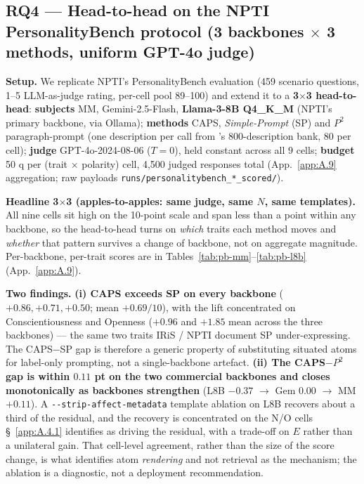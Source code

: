 

\subsection{RQ4 --- Head-to-head on the NPTI PersonalityBench protocol (3 backbones $\times$ 3 methods, uniform GPT-4o judge)}
\label{sec:4.4}

\textbf{Setup.} We replicate NPTI's PersonalityBench evaluation \cite{NPTI} (459 scenario questions, 1--5 LLM-as-judge rating, per-cell pool 89--100) and extend it to a \textbf{3$\times$3 head-to-head}: \textbf{subjects} MM, Gemini-2.5-Flash, \textbf{Llama-3-8B Q4\_K\_M} (NPTI's primary backbone, via Ollama); \textbf{methods} CAPS, \textit{Simple-Prompt} (SP) and \textit{$P^{\!2}$} \cite{jiang2023p2} paragraph-prompt (one description per call from \citet{NPTI}'s 800-description bank, 80 per cell); \textbf{judge} GPT-4o-2024-08-06 ($T=0$), held constant across all 9 cells; \textbf{budget} 50 q per (trait $\times$ polarity) cell, 4,500 judged responses total (App.~\ref{app:A.9} aggregation; raw payloads \texttt{runs/\allowbreak{}personalitybench\_\allowbreak{}*\_\allowbreak{}scored/\allowbreak{}}).

\textbf{Headline 3$\times$3 (apples-to-apples: same judge, same $N$, same templates).} All nine cells sit high on the 10-point scale and span less than a point within any backbone, so the head-to-head turns on \textit{which} traits each method moves and \textit{whether} that pattern survives a change of backbone, not on aggregate magnitude. Per-backbone, per-trait scores are in Tables~\ref{tab:pb-mm}--\ref{tab:pb-l8b} (App.~\ref{app:A.9}).

\textbf{Two findings.} \textbf{(i) CAPS exceeds SP on every backbone} ($+0.86, +0.71, +0.50$; mean $+0.69/10$), with the lift concentrated on Conscientiousness and Openness ($+0.96$ and $+1.85$ mean across the three backbones) --- the same two traits IRiS / NPTI document SP under-expressing. The CAPS$-$SP gap is therefore a generic property of substituting situated atoms for label-only prompting, not a single-backbone artefact. \textbf{(ii) The CAPS$-$$P^{\!2}$ gap is within $0.11$ pt on the two commercial backbones and closes monotonically as backbones strengthen} (L8B $-0.37$ $\to$ Gem $0.00$ $\to$ MM $+0.11$). A \texttt{-\allowbreak{}-\allowbreak{}strip-\allowbreak{}affect-\allowbreak{}metadata} template ablation on L8B recovers about a third of the residual, and the recovery is concentrated on the N/O cells \S~\ref{app:A.4.1} identifies as driving the residual, with a trade-off on $E$ rather than a unilateral gain. That cell-level agreement, rather than the size of the score change, is what identifies atom \textit{rendering} and not retrieval as the mechanism; the ablation is a diagnostic, not a deployment recommendation.

